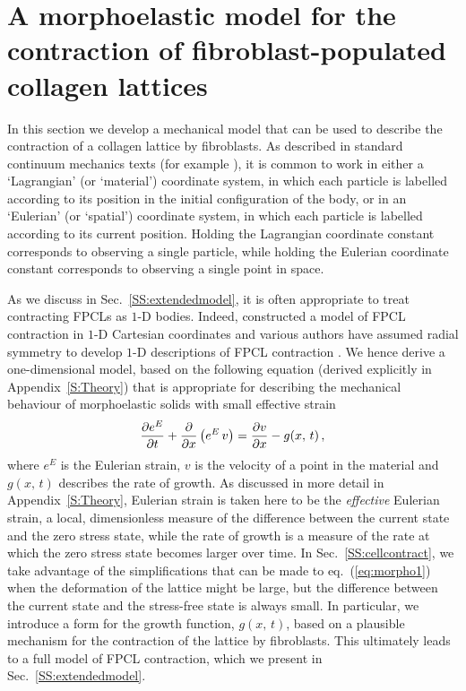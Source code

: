 \section{A morphoelastic model for the contraction of fibroblast-populated collagen lattices}
\label{S:application}

In this section we develop a mechanical model that can be used to describe the contraction of a collagen lattice by fibroblasts.
As described in standard continuum mechanics texts (for example \citet{GonzalezCM}), it is common to work in either a `Lagrangian' (or `material') coordinate system, in which each particle is labelled according to its position in the initial configuration of the body, or in an `Eulerian' (or `spatial') coordinate system, in which each particle is labelled according to its current position. Holding the Lagrangian coordinate constant corresponds to observing a single particle, while holding the Eulerian coordinate constant corresponds to observing a single point in space.

As we discuss in Sec.~\ref{SS:extendedmodel}, it is often appropriate to treat contracting FPCLs as $1$-D bodies. Indeed, \citet{Ferrenq1997} constructed a model of FPCL contraction in $1$-D Cartesian coordinates and various authors have assumed radial symmetry to develop $1$-D descriptions of FPCL contraction \citep{Moon1993,Ramtani2002,Ramtani2004}. We hence derive a one-dimensional model, based on the following equation (derived explicitly in Appendix~\ref{S:Theory}) that is appropriate for describing the mechanical behaviour of morphoelastic solids with small effective strain
\begin{gather}
\label{eq:morpho1}
\pdiff{e^E}{t} + \pdiff{}{x} \left(e^E \, v \right)  =  \pdiff{v}{x} - g(x,\,t)\,,%
\end{gather}
where $e^E$ is the Eulerian strain, $v$ is the velocity of a point in the material and $g(x,\,t)$ describes the rate of growth. As discussed in more detail in Appendix~\ref{S:Theory}, Eulerian strain is taken here to be the \textit{effective} Eulerian strain, a local, dimensionless measure of the difference between the current state and the zero stress state, while the rate of growth is a measure of the rate at which the zero stress state becomes larger over time. In Sec.~\ref{SS:cellcontract}, we take advantage of the simplifications that can be made to eq.~(\ref{eq:morpho1}) when the deformation of the lattice might be large, but the difference between the current state and the stress-free state is always small. In particular, we introduce a form for the growth function, $g(x,\,t)$, based on a plausible mechanism for the contraction of the lattice by fibroblasts. This ultimately leads to a full model of FPCL contraction, which we present in Sec.~\ref{SS:extendedmodel}.

